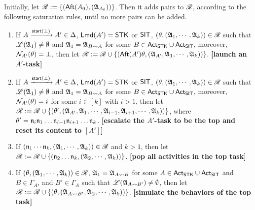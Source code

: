 Initially, let $\mathscr{R} := \{({\sf Aft}(A_0),({\mathfrak{A} }_{A_0}))\}$.
Then it adds pairs to $\mathscr{R}$, according to the following saturation rules, until no more pairs can be added. 
 
\fbox
{
\begin{minipage}{0.9\textwidth}
\begin{enumerate}
    \item If $A \xrightarrow{{\mathsf{start} }(\bot)}A' \in\Delta$, ${\sf Lmd}(A')=\mathsf{STK}$ or ${\sf SIT}$, $(\theta, ({\mathfrak{A} }_1,\cdots,{\mathfrak{A} }_k)) \in \mathscr{R}$ such that ${\mathscr{L} }({\mathfrak{A} }_1) \neq \emptyset$ and ${\mathfrak{A} }_1 = {\mathfrak{A} }_{B\rightsquigarrow A}$ for some $B \in {\sf Act}_{\sf STK}\cup{\sf Act}_{\sf SIT}$, moreover, $\mathcal{N}_{A'}(\theta) = \bot$,
    then let $\mathscr{R}: = \mathscr{R} \cup \{({\sf Aft}(A')\theta, ({\mathfrak{A} }_{A'},{\mathfrak{A} }_1,\cdots,{\mathfrak{A} }_k))\}$.
        \textbf{[launch an $A'$-task]}

    \item If $A \xrightarrow{{\mathsf{start} }(\bot)}A' \in\Delta$, ${\sf Lmd}(A')=\mathsf{STK}$ or ${\sf SIT}$, $(\theta, ({\mathfrak{A} }_1,\cdots,{\mathfrak{A} }_k)) \in \mathscr{R}$ such that ${\mathscr{L} }({\mathfrak{A} }_1) \neq \emptyset$ and ${\mathfrak{A} }_1 = {\mathfrak{A} }_{B\rightsquigarrow A}$ for some $B \in {\sf Act}_{\sf STK}\cup{\sf Act}_{\sf SIT}$, moreover, $\mathcal{N}_{A'}(\theta) = i$ for some $i \in [k]$ with $i > 1$, 
        then let $\mathscr{R}:= \mathscr{R} \cup \{(\theta', ({\mathfrak{A} }_{A'}, {\mathfrak{A} }_1, \cdots,{\mathfrak{A} }_{i-1},{\mathfrak{A} }_{i+1},\cdots,{\mathfrak{A} }_{k}))\}$, where $\theta' = \mathfrak{n}_i\mathfrak{n}_1\dots\mathfrak{n}_{i-1}\mathfrak{n}_{i+1}\dots\mathfrak{n}_k$. 
        \textbf{[escalate the $A'$-task to be the top and reset its content to $[A']$]}
    \item If $(\mathfrak{n}_1 \cdots \mathfrak{n}_k, ({\mathfrak{A} }_1,\cdots,{\mathfrak{A} }_k)) \in \mathscr{R}$ and $k>1$, then let $\mathscr{R} := \mathscr{R} \cup \{(\mathfrak{n}_2\dots\mathfrak{n}_k, ({\mathfrak{A} }_2,\cdots,{\mathfrak{A} }_k))\}$.
        \textbf{[pop all activities in the top task]}
%
    \item If $(\theta, ({\mathfrak{A} }_1,\cdots,{\mathfrak{A} }_k)) \in \mathscr{R}$, ${\mathfrak{A} }_1 = {\mathfrak{A} }_{A\rightsquigarrow B}$ for some $A\in{\sf Act}_{\mathsf{STK}}\cup{\sf Act}_{\mathsf{SIT}}$ and $B \in \Gamma_A$, and $B'  \in \Gamma_A$ such that ${\mathscr{L} }({\mathfrak{A} }_{A\rightsquigarrow B'}) \neq \emptyset$, then let 
    $\mathscr{R} := \mathscr{R} \cup \{(\theta, ({\mathfrak{A} }_{A\rightsquigarrow B'}, {\mathfrak{A} }_2,\cdots,{\mathfrak{A} }_k))\}$. 
        \textbf{[simulate the behaviors of the top task]}
\end{enumerate}
\end{minipage}
}
 

